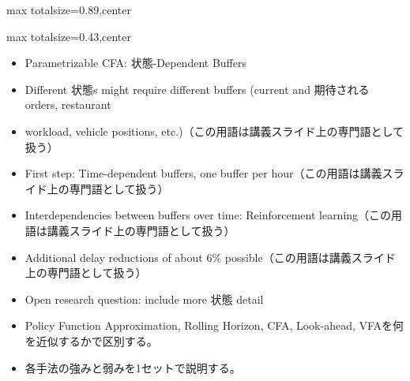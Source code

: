 \begin{minipage}[t]{0.58\textwidth}
\begin{adjustbox}{max totalsize={\textwidth}{0.89\textheight},center}
\begin{minipage}{\textwidth}
\end{minipage}
\end{adjustbox}
\end{minipage}


\clearpage
{}
\begin{minipage}[t]{0.405\textwidth}
\begin{adjustbox}{max totalsize={\textwidth}{0.43\textheight},center}
\begin{minipage}{\textwidth}\scriptsize
{}\begin{itemize}
\item Parametrizable CFA: 状態-Dependent Buffers
\item Different 状態s might require different buffers (current and 期待される orders, restaurant
\item workload, vehicle positions, etc.)（この用語は講義スライド上の専門語として扱う）
\item First step: Time-dependent buffers, one buffer per hour（この用語は講義スライド上の専門語として扱う）
\item Interdependencies between buffers over time: Reinforcement learning（この用語は講義スライド上の専門語として扱う）
\item Additional delay reductions of about 6\% possible（この用語は講義スライド上の専門語として扱う）
\item Open research question: include more 状態 detail
\end{itemize}\begin{itemize}
\item Policy Function Approximation, Rolling Horizon, CFA, Look-ahead, VFAを何を近似するかで区別する。
\item 各手法の強みと弱みを1セットで説明する。
\end{itemize}
\end{minipage}
\end{adjustbox}
\end{minipage}\hfill
